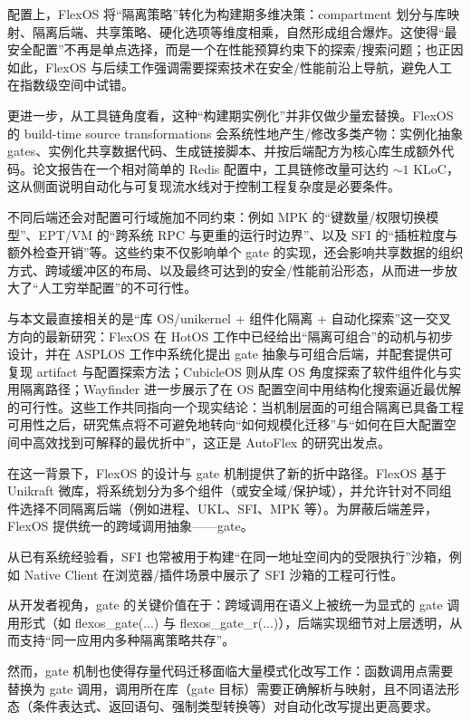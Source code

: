 \documentclass[UTF8,a4paper,12pt,twoside]{ctexart}  %
\begin{document}
配置上，FlexOS 将“隔离策略”转化为构建期多维决策：compartment 划分与库映射、隔离后端、共享策略、硬化选项等维度相乘，自然形成组合爆炸\cite{1,2}。这使得“最安全配置”不再是单点选择，而是一个在性能预算约束下的探索/搜索问题；也正因如此，FlexOS 与后续工作强调需要探索技术在安全/性能前沿上导航，避免人工在指数级空间中试错\cite{1,2}。

更进一步，从工具链角度看，这种“构建期实例化”并非仅做少量宏替换。FlexOS 的 build-time source transformations 会系统性地产生/修改多类产物：实例化抽象 gates、实例化共享数据代码、生成链接脚本、并按后端配方为核心库生成额外代码\cite{1,2}。论文报告在一个相对简单的 Redis 配置中，工具链修改量可达约 $\sim 1$ KLoC\cite{1,2}，这从侧面说明自动化与可复现流水线对于控制工程复杂度是必要条件。

不同后端还会对配置可行域施加不同约束：例如 MPK 的“键数量/权限切换模型”、EPT/VM 的“跨系统 RPC 与更重的运行时边界”、以及 SFI 的“插桩粒度与额外检查开销”等\cite{7,8,9}。这些约束不仅影响单个 gate 的实现，还会影响共享数据的组织方式、跨域缓冲区的布局、以及最终可达到的安全/性能前沿形态，从而进一步放大了“人工穷举配置”的不可行性。

与本文最直接相关的是``库 OS/unikernel + 组件化隔离 +
自动化探索''这一交叉方向的最新研究：FlexOS 在 HotOS
工作中已经给出``隔离可组合''的动机与初步设计\cite{5}，并在
ASPLOS 工作中系统化提出 gate
抽象与可组合后端，并配套提供可复现 artifact
与配置探索方法\cite{1,2}；CubicleOS 则从库 OS
角度探索了软件组件化与实用隔离路径\cite{6}；Wayfinder 进一步展示了在 OS
配置空间中用结构化搜索逼近最优解的可行性\cite{3}。这些工作共同指向一个现实结论：当机制层面的可组合隔离已具备工程可用性之后，研究焦点将不可避免地转向``如何规模化迁移''与``如何在巨大配置空间中高效找到可解释的最优折中''，这正是
AutoFlex 的研究出发点。

在这一背景下，FlexOS 的设计与 gate 机制提供了新的折中路径。FlexOS 基于 Unikraft
微库\cite{1,4}，将系统划分为多个组件（或安全域/保护域），并允许针对不同组件选择不同隔离后端（例如进程、UKL、SFI、MPK
等）\cite{7,8,9}。为屏蔽后端差异，FlexOS
提供统一的跨域调用抽象------gate\cite{1}。

从已有系统经验看，SFI
也常被用于构建``在同一地址空间内的受限执行''沙箱，例如 Native Client
在浏览器/插件场景中展示了 SFI 沙箱的工程可行性\cite{23}。

从开发者视角，gate 的关键价值在于：跨域调用在语义上被统一为显式的 gate
调用形式（如 flexos\_gate(...) 与
flexos\_gate\_r(...)），后端实现细节对上层透明，从而支持``同一应用内多种隔离策略共存''。

然而，gate
机制也使得存量代码迁移面临大量模式化改写工作：函数调用点需要替换为 gate
调用，调用所在库（gate
目标）需要正确解析与映射，且不同语法形态（条件表达式、返回语句、强制类型转换等）对自动化改写提出更高要求。
\end{document}
